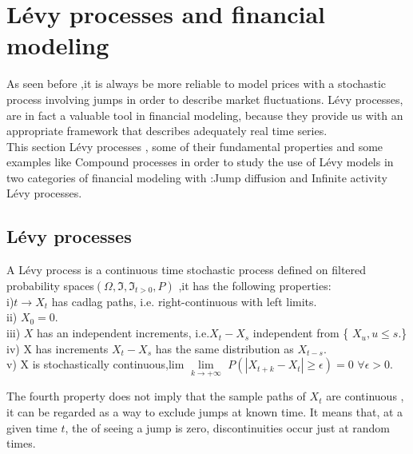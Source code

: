 \documentclass[12pt]{report}
\begin{document}
\chapter{Lévy processes and financial modeling}

As seen before ,it is always be more reliable to model prices with a stochastic process involving jumps in order to describe  market fluctuations.
Lévy processes, are in fact a valuable tool in financial modeling, because they  provide us with an appropriate
framework that describes adequately real time series.\\


This section  Lévy processes ,  some of their fundamental properties and  some examples like Compound  processes in order to study the use of Lévy models in two categories of financial modeling with  :Jump diffusion and Infinite activity Lévy processes.

\section{ Lévy processes }

A Lévy process is a continuous time stochastic process defined on filtered probability spaces$(\Omega,\mathfrak{I},\mathfrak{I}_{t>0},P)$ ,it has the following properties:\\
i)$t \rightarrow X _t$ has cadlag paths, i.e. right-continuous with left limits.\\
ii) $X_0=0$.\\
iii) $X$ has an independent increments, i.e.$ X_t- X_s$ independent from \{ $X_u,{ u \leqslant s}.$\}\\
iv) X has  increments $X_t-X_s$ has the same distribution as $ X_{t-s}.$\\
v) X is stochastically continuous,lim $\lim\limits_{k \rightarrow +\infty}$ $P(|X_{t+k}-X_t|  \geqslant \epsilon)=   0 $   $   \forall       \epsilon > 0.$

The fourth property does not imply that the sample paths of $ X_t$ are continuous , it can be regarded as a way to exclude jumps at known time. It means that, at a given time $t$, the  of seeing a jump is zero, discontinuities occur just at random times.\\
\end{document}
